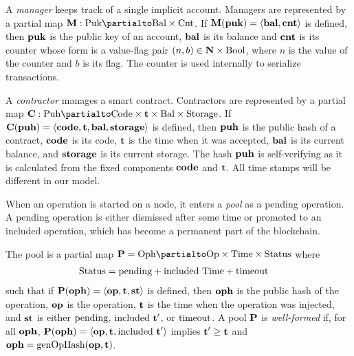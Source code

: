 \documentclass[a4paper]{llncs}
\begin{document}
A \emph{manager} keeps track of a single implicit account. Managers are
represented by a partial map $\MANAGERS : \TPUK \partialto \TBAL
\times \TCOU$. If $\textbf{M} (\textbf{puk}) = \langle\textbf{bal}, \textbf{cnt}\rangle$ is defined, then  $\textbf{puk}$ is the
public key of an account, $\textbf{bal}$ is its
balance and $\textbf{cnt}$ is its counter whose form is a value-flag pair
$(n,b) \in \textbf{N}\times\text{Bool}$, where $n$ is the value of the counter
and ${b}$ is its flag.   The counter is used internally to serialize transactions.

A \emph{contractor} manages a smart contract. Contractors are
represented by a partial map $\CONTRACTORS : \TPUH \partialto
\TCODE \times \TIME  \times \TBAL \times  \TSTORAGE$. If $\textbf{C} (\textbf{puh}) = \langle
\textbf{code}, \textbf{t}, \textbf{bal}, \textbf{storage} \rangle $ is defined, then $\textbf{puh}$ is the
public hash of a contract,
$\textbf{code}$ is its  code,
$\textbf{t}$ is the time when it was accepted,
$\textbf{bal}$ is its current balance,
and $\textbf{storage}$ is its current storage. The hash $\textbf{puh}$ is
self-verifying as it is calculated from the fixed components $\textbf{code}$
and $\textbf{t}$. All time stamps will be different in our model.

When an operation is started on a node, it enters a \emph{pool} as a
pending operation. A pending operation is either dismissed after some time or
promoted to an included operation, which has become a permanent part
of the blockchain.

The pool is a partial map $  \PENDING= \TOPH \partialto
\TOP\times \TTIME \times \TSTATUS$ where
\begin{align*}
  \text{Status}&= \text{pending} + \text{included}\ \text{Time} + \text{timeout}
\end{align*}
such that
if $\textbf{P}(\textbf{oph}) = \langle  \textbf{op}, \textbf{t}, \textbf{st}
\rangle $ is defined, then $\textbf{oph}$ is the public hash of the operation, $\textbf{op}$ is the operation, $\textbf{t}$ is the time when the
operation was injected, and $\textbf{st}$ is either $\text{pending}$,
$\text{included}\ \textbf{t}'$, or $\text{timeout}$.
A pool $\textbf{P}$ is \emph{well-formed} if, for all $\textbf{oph}$, $\textbf{P} (\textbf{oph}) =
\langle\textbf{op},\textbf{t}, \text{included}\ \textbf{t}'\rangle$ implies $\textbf{t}' \ge
\textbf{t}$ and $\textbf{oph} = \textup{genOpHash} (\textbf{op}, \textbf{t})$.
\end{document}
